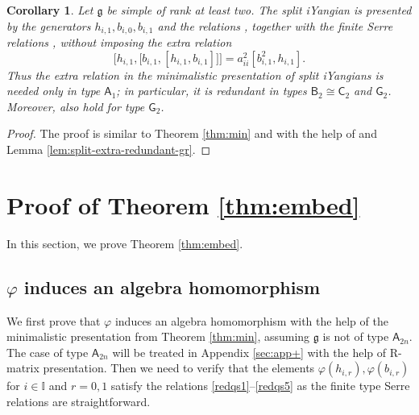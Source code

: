 \documentclass[11pt,reqno]{amsart}
\numberwithin{equation}{section}
\newtheorem{cor}[thm]{Corollary}
\theoremstyle{definition}
\theoremstyle{remark}
\newcommand{\g}{\mathfrak{g}}
\newcommand{\I}{{\mathbb I}}
\begin{document}
\begin{cor}\label{cor:split-extra-redundant-quantum}
Let $\g$ be simple of rank at least two. The split iYangian is
presented by the generators $h_{i,1},b_{i,0},b_{i,1}$ and the relations
\cite[(3.1)--(3.3)]{Lu26min}, together with the finite Serre relations \cite[(2.30)--(2.33)]{Lu26min},
without imposing the extra relation
\begin{equation*}
 \Big[h_{i,1},
   \big[b_{i,1},[h_{i,1},b_{i,1}]\big]
 \Big]
 =a_{ii}^2[b_{i,1}^2,h_{i,1}].
\end{equation*}
Thus the extra relation in the minimalistic presentation of split iYangians is
needed only in type $\mathsf A_1$; in particular, it is redundant in
types $\mathsf B_2\cong\mathsf C_2$ and $\mathsf G_2$. Moreover,  \cite[Theorems~4.1 and~5.1]{Lu26min} also hold for type $\mathsf G_2$.
\end{cor}
\begin{proof}
The proof is similar to Theorem \ref{thm:min} and \cite[Theorem 3.1]{Lu26min} with the help of \cite[Proposition 3.2]{Lu26min} and Lemma \ref{lem:split-extra-redundant-gr}.
\end{proof}

\section{Proof of Theorem \ref{thm:embed}}\label{sec:pfthmB0}
In this section, we prove Theorem \ref{thm:embed}. 
\subsection{$\varphi$ induces an algebra homomorphism}\label{ssec:homo}
We first prove that $\varphi$ induces an algebra homomorphism with the help of the minimalistic presentation from Theorem \ref{thm:min}, assuming $\g$ is not of type $\mathsf A_{2n}$. The case of type $\mathsf A_{2n}$ will be treated in Appendix \ref{sec:app+} with the help of R-matrix presentation. Then we need to verify that the elements $\varphi(h_{i,r}),\varphi(b_{i,r})$ for $i\in\I$ and $r=0,1$ satisfy the relations \eqref{redqs1}--\eqref{redqs5} as the finite type Serre relations are straightforward.
\end{document}
